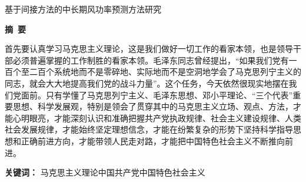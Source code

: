 \documentclass[a4paper, zihao=-4, twoside, fontset=fandol]{ctexart}
\begin{document}
{
    \newpage
    \thispagestyle{plain}  %
    
    \setcounter{page}{1}  %
    
    
    {
        \heiti
        \centering
        \bfseries
    
        基于间接方法的中长期风功率预测方法研究
    
        \mbox{}
    
        \par %
    }
    
    {    
        \heiti
        \bfseries
        \centering
        摘\ 要
    
        \mbox{}
    
        \par %
    }
    
    {
        \songti
        \raggedright
        \quad\quad 首先要认真学习马克思主义理论，这是我们做好一切工作的看家本领，也是领导干部必须普遍掌握的工作制胜的看家本领。毛泽东同志曾经提出，“如果我们党有一百个至二百个系统地而不是零碎地、实际地而不是空洞地学会了马克思列宁主义的同志，就会大大地提高我们党的战斗力量”。这个任务，今天依然很现实地摆在我们党面前。只有学懂了马克思列宁主义、毛泽东思想、邓小平理论、“三个代表”重要思想、科学发展观，特别是领会了贯穿其中的马克思主义立场、观点、方法，才能心明眼亮，才能深刻认识和准确把握共产党执政规律、社会主义建设规律、人类社会发展规律，才能始终坚定理想信念，才能在纷繁复杂的形势下坚持科学指导思想和正确前进方向，才能带领人民走对路，才能把中国特色社会主义不断推向前进。
    
        \mbox{}
    
        \par %
    }
    
    {
        \raggedright
        {\heiti\textbf{关键词：}}
        马克思主义理论\quad 中国共产党\quad 中国特色社会主义

        \par %
    }
}
\end{document}
